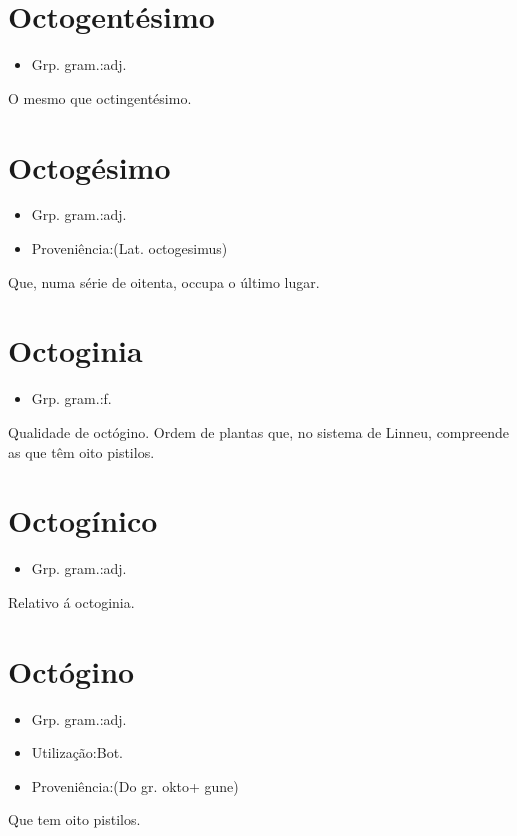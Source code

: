 \section{Octogentésimo}
\begin{itemize}
\item {Grp. gram.:adj.}
\end{itemize}
O mesmo que \textunderscore octingentésimo\textunderscore .
\section{Octogésimo}
\begin{itemize}
\item {Grp. gram.:adj.}
\end{itemize}
\begin{itemize}
\item {Proveniência:(Lat. \textunderscore octogesimus\textunderscore )}
\end{itemize}
Que, numa série de oitenta, occupa o último lugar.
\section{Octoginia}
\begin{itemize}
\item {Grp. gram.:f.}
\end{itemize}
Qualidade de octógino.
Ordem de plantas que, no sistema de Linneu, compreende as que têm oito pistilos.
\section{Octogínico}
\begin{itemize}
\item {Grp. gram.:adj.}
\end{itemize}
Relativo á octoginia.
\section{Octógino}
\begin{itemize}
\item {Grp. gram.:adj.}
\end{itemize}
\begin{itemize}
\item {Utilização:Bot.}
\end{itemize}
\begin{itemize}
\item {Proveniência:(Do gr. \textunderscore okto\textunderscore  + \textunderscore gune\textunderscore )}
\end{itemize}
Que tem oito pistilos.
